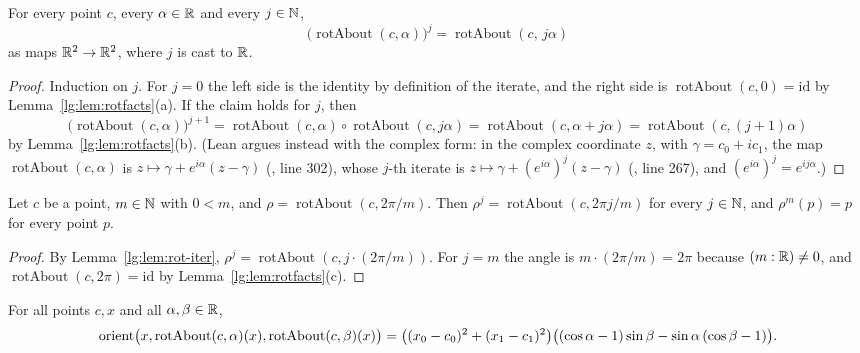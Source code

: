 \begin{lemma}\label{lg:lem:rot-iter}
For every point $c$, every $\alpha\in\mathbb R$ and every $j\in\mathbb N$,
\[
  \bigl(\operatorname{rotAbout}(c,\alpha)\bigr)^{j}=\operatorname{rotAbout}(c,\,j\alpha)
\]
as maps $\mathbb R^2\to\mathbb R^2$, where $j$ is cast to $\mathbb R$.
\end{lemma}

\begin{proof}
Induction on $j$. For $j=0$ the left side is the identity by definition of the iterate, and the right side is
$\operatorname{rotAbout}(c,0)=\mathrm{id}$ by Lemma~\ref{lg:lem:rotfacts}(a). If the claim holds for $j$, then
\[
  \bigl(\operatorname{rotAbout}(c,\alpha)\bigr)^{j+1}=\operatorname{rotAbout}(c,\alpha)\circ\operatorname{rotAbout}(c,j\alpha)
  =\operatorname{rotAbout}(c,\alpha+j\alpha)=\operatorname{rotAbout}(c,(j+1)\alpha)
\]
by Lemma~\ref{lg:lem:rotfacts}(b). (Lean argues instead with the complex form: in the complex coordinate $z$, with
$\gamma=c_0+ic_1$, the map $\operatorname{rotAbout}(c,\alpha)$ is $z\mapsto\gamma+e^{i\alpha}(z-\gamma)$
(, line 302), whose $j$-th iterate is $z\mapsto\gamma+(e^{i\alpha})^{j}(z-\gamma)$
(, line 267), and $(e^{i\alpha})^{j}=e^{ij\alpha}$.)
\end{proof}

\begin{corollary}\label{lg:cor:period}
Let $c$ be a point, $m\in\mathbb N$ with $0<m$, and $\rho=\operatorname{rotAbout}(c,2\pi/m)$. Then $\rho^{j}=
\operatorname{rotAbout}(c,2\pi j/m)$ for every $j\in\mathbb N$, and $\rho^{m}(p)=p$ for every point $p$.
\end{corollary}

\begin{proof}
By Lemma~\ref{lg:lem:rot-iter}, $\rho^{j}=\operatorname{rotAbout}(c,j\cdot(2\pi/m))$. For $j=m$ the angle is
$m\cdot(2\pi/m)=2\pi$ because $(m:\mathbb R)\ne0$, and $\operatorname{rotAbout}(c,2\pi)=\mathrm{id}$ by
Lemma~\ref{lg:lem:rotfacts}(c).
\end{proof}

\begin{lemma}\label{lg:lem:orient-rot}
For all points $c,x$ and all $\alpha,\beta\in\mathbb R$,
\[
  \operatorname{orient}\bigl(x,\operatorname{rotAbout}(c,\alpha)(x),\operatorname{rotAbout}(c,\beta)(x)\bigr)
  =\bigl((x_0-c_0)^2+(x_1-c_1)^2\bigr)\bigl((\cos\alpha-1)\sin\beta-\sin\alpha\,(\cos\beta-1)\bigr).
\]
\end{lemma}

